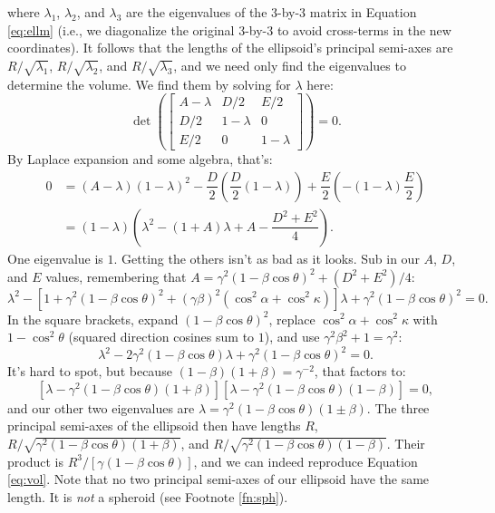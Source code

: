\documentclass[12pt]{article}
\begin{document}
where $\lambda_1$, $\lambda_2$, and $\lambda_3$ are the eigenvalues of the 3-by-3 matrix in Equation \ref{eq:ellm} (i.e., we diagonalize the original 3-by-3 to avoid cross-terms in the new coordinates). It follows that the lengths of the ellipsoid's principal semi-axes are $R / \sqrt{\lambda_1}$, $R / \sqrt{\lambda_2}$, and $R / \sqrt{\lambda_3}$, and we need only find the eigenvalues to determine the volume. We find them by solving for $\lambda$ here:
\begin{equation*}
\det
\left(
\begin{bmatrix}
A - \lambda & D/2 & E/2 \\
D/2 & 1 - \lambda & 0 \\
E/2 & 0 & 1 - \lambda
\end{bmatrix}
\right)
= 0 .
\end{equation*}
By Laplace expansion and some algebra, that's:
\begin{equation*}
\begin{aligned}
0 &= \left( A - \lambda \right) \left( 1 - \lambda \right)^2 - \dfrac{D}{2} \left( \dfrac{D}{2} \left(1 - \lambda \right) \right) + \dfrac{E}{2} \left( - \left(1 - \lambda \right) \dfrac{E}{2} \right) \\[5pt]
&= \left(1 - \lambda \right) \left( \lambda^2 - \left( 1 + A \right)\lambda + A - \dfrac{D^2 + E^2}{4} \right).
\end{aligned}
\end{equation*}
One eigenvalue is $1$. Getting the others isn't as bad as it looks. Sub in our $A$, $D$, and $E$ values, remembering that $A = \gamma^2 (1 - \beta \cos \theta)^2 + (D^2 + E^2)/4$:
\begin{equation*}
\lambda^2 - \left[ 1 + \gamma^2 (1 - \beta \cos \theta)^2 + (\gamma \beta)^2 ( \cos^2 \alpha + \cos^2 \kappa ) \right] \lambda + \gamma^2 (1 - \beta \cos \theta)^2 = 0.
\end{equation*}
In the square brackets, expand $(1 - \beta \cos \theta)^2$, replace ${\cos^2 \alpha + \cos^2 \kappa}$ with ${1 - \cos^2 \theta}$ (squared direction cosines sum to $1$), and use $\gamma^2 \beta^2 + 1 = \gamma^2$:
\begin{equation*}
\lambda^2 - 2 \gamma^2 ( 1 - \beta \cos \theta ) \lambda + \gamma^2 (1 - \beta \cos \theta)^2 = 0.
\end{equation*}
It's hard to spot, but because $(1 - \beta)(1 + \beta) = \gamma^{-2}$, that factors to:
\begin{equation*}
\left[ \lambda - \gamma^2 (1 - \beta \cos \theta) (1 + \beta) \right] \left[ \lambda - \gamma^2 (1 - \beta \cos \theta) (1 - \beta) \right] = 0,
\end{equation*}
and our other two eigenvalues are $\lambda = \gamma^2 (1 - \beta \cos \theta)(1 \pm \beta)$. The three principal semi-axes of the ellipsoid then have lengths $R$, $R /  \sqrt{\gamma^2 (1 - \beta \cos \theta)(1 + \beta)}$, and $R / \sqrt{\gamma^2 (1 - \beta \cos \theta)(1 - \beta)}$. Their product is $R^3 / [\gamma(1 - \beta \cos \theta)]$, and we can indeed reproduce Equation \ref{eq:vol}. Note that no two principal semi-axes of our ellipsoid have the same length. It is \emph{not} a spheroid (see Footnote \ref{fn:sph}).
\end{document}
